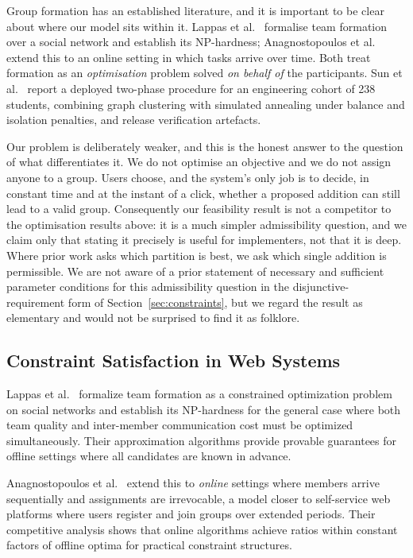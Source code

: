 \documentclass[11pt,a4paper]{article}
\theoremstyle{plain}
\theoremstyle{definition}
\theoremstyle{remark}
\begin{document}
Group formation has an established literature, and it is important to be clear about where our model sits within it. Lappas et al.~\cite{lappas2009} formalise team formation over a social network and establish its NP-hardness; Anagnostopoulos et al.~\cite{anagnostopoulos2012} extend this to an online setting in which tasks arrive over time. Both treat formation as an \emph{optimisation} problem solved \emph{on behalf of} the participants. Sun et al.~\cite{sun2026} report a deployed two-phase procedure for an engineering cohort of 238 students, combining graph clustering with simulated annealing under balance and isolation penalties, and release verification artefacts.

Our problem is deliberately weaker, and this is the honest answer to the question of what differentiates it. We do not optimise an objective and we do not assign anyone to a group. Users choose, and the system's only job is to decide, in constant time and at the instant of a click, whether a proposed addition can still lead to a valid group. Consequently our feasibility result is not a competitor to the optimisation results above: it is a much simpler admissibility question, and we claim only that stating it precisely is useful for implementers, not that it is deep. Where prior work asks which partition is best, we ask which single addition is permissible. We are not aware of a prior statement of necessary and sufficient parameter conditions for this admissibility question in the disjunctive-requirement form of Section~\ref{sec:constraints}, but we regard the result as elementary and would not be surprised to find it as folklore.

\subsection{Constraint Satisfaction in Web Systems}

Lappas et al.~\cite{lappas2009} formalize team formation as a constrained optimization problem on social networks and establish its NP-hardness for the general case where both team quality and inter-member communication cost must be optimized simultaneously. Their approximation algorithms provide provable guarantees for offline settings where all candidates are known in advance.

Anagnostopoulos et al.~\cite{anagnostopoulos2012} extend this to \emph{online} settings where members arrive sequentially and assignments are irrevocable, a model closer to self-service web platforms where users register and join groups over extended periods. Their competitive analysis shows that online algorithms achieve ratios within constant factors of offline optima for practical constraint structures.
\end{document}
